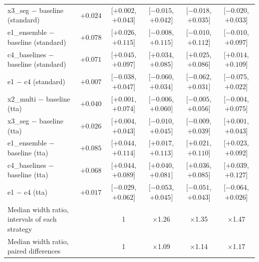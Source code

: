 \begin{tabular}{@{} l c c c c c @{}}
x3\_seg $-$ baseline (standard) & $+0.024$ & [$+0.002$, $+0.043$] & [$-0.015$, $+0.042$] & [$-0.018$, $+0.035$] & [$-0.020$, $+0.033$] \\
e1\_ensemble $-$ baseline (standard) & $+0.078$ & [$+0.026$, $+0.115$] & [$-0.008$, $+0.115$] & [$-0.010$, $+0.112$] & [$-0.010$, $+0.097$] \\
c4\_baselines $-$ baseline (standard) & $+0.071$ & [$+0.045$, $+0.097$] & [$+0.034$, $+0.085$] & [$+0.025$, $+0.086$] & [$+0.014$, $+0.109$] \\
e1 $-$ c4 (standard) & $+0.007$ & [$-0.038$, $+0.047$] & [$-0.060$, $+0.034$] & [$-0.062$, $+0.031$] & [$-0.075$, $+0.022$] \\
x2\_multi $-$ baseline (tta) & $+0.040$ & [$+0.001$, $+0.074$] & [$-0.006$, $+0.060$] & [$-0.005$, $+0.056$] & [$-0.004$, $+0.075$] \\
x3\_seg $-$ baseline (tta) & $+0.026$ & [$+0.004$, $+0.043$] & [$-0.010$, $+0.045$] & [$-0.009$, $+0.039$] & [$+0.001$, $+0.043$] \\
e1\_ensemble $-$ baseline (tta) & $+0.085$ & [$+0.044$, $+0.114$] & [$+0.017$, $+0.113$] & [$+0.021$, $+0.110$] & [$+0.023$, $+0.092$] \\
c4\_baselines $-$ baseline (tta) & $+0.068$ & [$+0.044$, $+0.089$] & [$+0.040$, $+0.081$] & [$+0.036$, $+0.085$] & [$+0.039$, $+0.127$] \\
e1 $-$ c4 (tta) & $+0.017$ & [$-0.029$, $+0.062$] & [$-0.053$, $+0.045$] & [$-0.051$, $+0.043$] & [$-0.064$, $+0.026$] \\
\midrule
Median width ratio, intervals of each strategy & & 1 & $\times$1.26 & $\times$1.35 & $\times$1.47 \\
Median width ratio, paired differences & & 1 & $\times$1.09 & $\times$1.14 & $\times$1.17 \\
\bottomrule
\end{tabular}
